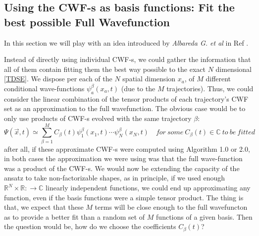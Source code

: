 \documentclass[11pt, a4paper]{article} %
\newcommand{\R}{\mathbb{R}} %
\newcommand{\C}{\mathbb{C}}
\begin{document}
\subsection{ Using the CWF-s as basis functions: Fit the best possible Full Wavefunction}

In this section we will play with an idea introduced by {\em Albareda G. et al} in Ref \cite{Albareda}.


Instead of directly using individual CWF-s, we could gather the information that all of them contain fitting them the best way possible to the exact $N$ dimensional \ref{TDSE}. We dispose per each of the $N$ spatial dimension $x_a$, of $M$ different conditional wave-functions $\psi^\beta_a(x_a,t)$ (due to the $M$ trajectories). Thus, we could consider the linear combination of the tensor products of each trajectory's CWF set as an approximation to the full wavefunction. The obvious case would be to only use products of CWF-s evolved with the same trajectory $\beta$:
$$
\Psi(\vec{x},t)\simeq \sum_{\beta=1}^{M} C_\beta(t) \psi^\beta_1(x_1,t)\cdots \psi^\beta_N(x_N,t) \quad for\ some\ C_\beta(t)\in \C\ to\ be\ fitted
$$
after all, if these approximate CWF-s were computed using Algorithm 1.0 or 2.0, in both cases the approximation we were using was that the full wave-function was a product of the CWF-s. We would now be extending the capacity of the ansatz to take non-factorizable shapes, as in principle, if we used enough $\R^N \times \R:\rightarrow \C$ linearly independent functions, we could end up approximating any function, even if the basis functions were a simple tensor product. The thing is that, we expect that these $M$ terms will be close enough to the full wavefuncton as to provide a better fit than a random set of $M$ functions of a given basis. Then the question would be, how do we choose the coefficients $C_\beta (t)$?
\end{document}
